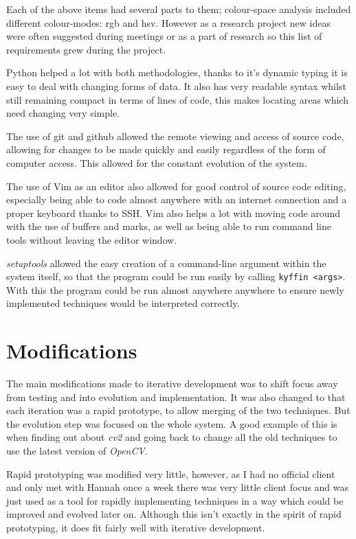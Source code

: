 Each of the above items had several parts to them; colour-space analysis included different 
colour-modes: \gls{rgb} and \gls{hsv}. However as a research project new ideas were often 
suggested during meetings or as a part of research so this list of requirements grew during the
project.

Python helped a lot with both methodologies, thanks to it's dynamic typing it is easy to deal with
changing forms of data. It also has very readable syntax whilst still remaining compact in terms
of lines of code, this makes locating areas which need changing very simple.

The use of git and github allowed the remote viewing and access of source code, allowing for
changes to be made quickly and easily regardless of the form of computer access. This 
allowed for the constant evolution of the system.

The use of Vim as an editor also allowed for good control of source code editing, especially being
able to code almost anywhere with an internet connection and a proper keyboard thanks to SSH. Vim
also helps a lot with moving code around with the use of buffers and marks, as well as being able
to run command line tools without leaving the editor window.

\emph{setuptools} allowed the easy creation of a command-line argument within the system itself,
so that the program could be run easily by calling \texttt{kyffin <args>}. With this the program
could be run almost anywhere anywhere to ensure newly implemented techniques would be 
interpreted correctly.


\section{Modifications}

The main modifications made to iterative development was to shift focus away from testing and into
evolution and implementation. It was also changed to that each iteration was a rapid prototype,
to allow merging of the two techniques. But the evolution step was focused on the whole system.
A good example of this is when finding out about \emph{cv2} and going back to change all the old
techniques to use the latest version of \emph{OpenCV}.

Rapid prototyping was modified very little, however, as I had no official client and only met with
Hannah once a week there was very little client focus and was just used as a tool for rapidly
implementing techniques in a way which could be improved and evolved later on. Although this isn't
exactly in the spirit of rapid prototyping, it does fit fairly well with iterative development.

